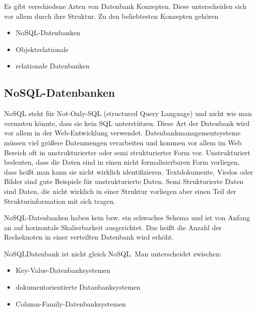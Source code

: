\begin{flushleft}
Es gibt verschiedene Arten von Datenbank Konzepten. Diese unterscheiden sich vor allem durch ihre Struktur. Zu den beliebtesten Konzepten gehören
\begin{itemize}
    \item NoSQL-Datenbanken
\end{itemize}
\begin{itemize}
    \item Objektrelationale
\end{itemize}
\begin{itemize}
    \item relationale Datenbanken
\end{itemize}
\break

\subsection{NoSQL-Datenbanken}

NoSQL steht für Not-Only-SQL (structured Query Language) und nicht wie man vermuten könnte, dass sie kein SQL unterstützen. Diese Art der Datenbank wird vor allem in der Web-Entwicklung verwendet. Datenbankmanagementsysteme müssen viel größere Datenmengen verarbeiten und kommen vor allem im Web Bereich oft in unstrukturierter oder semi strukturierter Form vor.
Unstrukturiert bedeuten, dass die Daten sind in einen nicht formalisierbaren Form vorliegen, dass heißt man kann sie nicht wirklich identifizieren. Textdokumente, Viedos oder Bilder sind gute Beispiele für unstrukturierte Daten. 
Semi Strukturierte Daten sind Daten, die nicht wirklich in einer Struktur vorliegen aber einen Teil der Strukturinformation mit sich tragen.

NoSQL-Datenbanken haben kein bzw. ein schwaches Schema und ist von Anfang an auf horizontale Skalierbarkeit ausgerichtet. Das heißt die Anzahl der Recheknoten in einer verteilten Datenbank wird erhöht.

NoSQLDatenbank ist nicht gleich NoSQL.
Man unterscheidet zwischen:
\begin{itemize}
    \item Key-Value-Datenbanksystemen
\end{itemize}
\begin{itemize}
    \item dokumentorientierte Datanbanksystemen
\end{itemize}
\begin{itemize}
    \item Column-Family-Datenbanksystemen
\end{itemize}


\end{flushleft}
